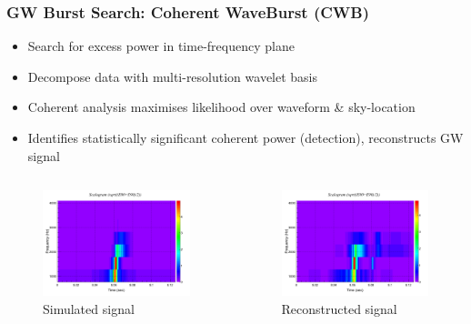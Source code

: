 \documentclass[serif,mathserif,10pt]{beamer}
\let\oldframetitle\frametitle%
\renewcommand{\frametitle}[1]{%
      \oldframetitle{#1}\setstretch{1.2}}
\begin{document}
\begin{frame}
    \frametitle{GW Burst Search: Coherent WaveBurst (CWB)}
    \begin{itemize}
        \item Search for excess power in time-frequency plane
        \item Decompose data with multi-resolution wavelet basis
        \item Coherent analysis maximises likelihood over waveform \&
            sky-location~\cite{Klimenko:2005wa,Klimenko:2007hd}
        \item Identifies statistically significant coherent power (detection),
            reconstructs GW signal
    \end{itemize}

    \begin{columns}


        \begin{center}
            \vspace{-0.1cm}
            \begin{figure}
                \includegraphics[width=0.7\columnwidth]{figures/L1_wf_white_inj_tf.png}
                \caption{Simulated signal}
            \end{figure}
        \end{center}


        \begin{center}
            \vspace{-0.1cm}
            \begin{figure}
                \includegraphics[width=0.7\columnwidth]{figures/L1_wf_white_rec_tf.png}
                \caption{Reconstructed signal}
            \end{figure}
        \end{center}


\end{columns}
\end{frame}
\end{document}
